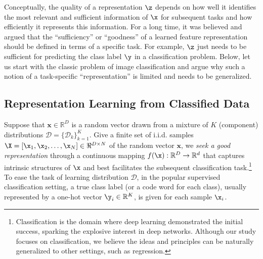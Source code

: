 \documentclass[../../book-main.tex]{subfiles}
\begin{document}
Conceptually, the quality of a representation $\z$ depends on how well it identifies the most relevant and sufficient information of $\x$ for subsequent tasks and how efficiently it represents this information.
For a long time, it was believed and argued that the ``sufficiency'' or ``goodness'' of a learned feature representation should be defined in terms of a specific task. For example, $\z$ just needs to be sufficient for predicting the class label $\y$ in a classification problem. Below, let us start with the classic problem of image classification and argue why such a notion of a task-specific ``representation'' is limited and needs to be generalized.













\subsection{Representation Learning from Classified Data}

Suppose that $\bm{x} \in \mathbb{R}^D$ is a random vector drawn from a mixture of $K$ (component) distributions  $\mathcal{D} = \{\mathcal{D}_k\}_{k=1}^K$. Give a finite set of i.i.d. samples $\X = [\x_1, \x_2, \ldots, \x_N] \in \Re^{D\times N}$ of the random vector $\bm x$, we {\em seek a good representation}  through a continuous mapping $f(\x): \mathbb{R}^D \rightarrow \mathbb{R}^d$ that captures intrinsic structures of $\x$ and best facilitates the subsequent classification task.\footnote{Classification is the domain where deep learning demonstrated the initial success, sparking the explosive interest in deep networks. Although our study focuses on classification, we believe the ideas and principles can be naturally generalized to other settings, such as regression.} To ease the task of learning distribution $\mathcal{D}$, in the popular supervised classification setting, a true class label (or a code word for each class), usually represented by a one-hot vector $\y_i \in \mathbb{R}^K$, is given for each sample $\x_i$.

 
\end{document}

